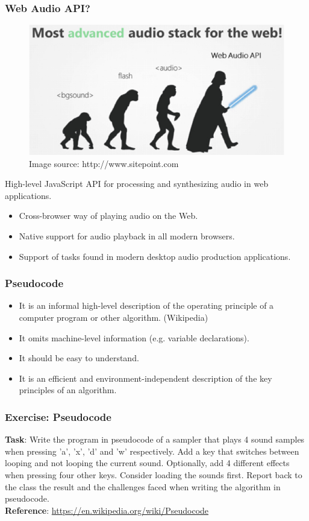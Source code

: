 \documentclass[screen, aspectratio=43]{beamer}
\begin{document}
\begin{frame}
\frametitle{Web Audio API?}
\begin{figure}
\includegraphics[scale=0.3]{img/advanced-web-audio.jpg}
{\\ \tiny Image source: http://www.sitepoint.com}\\
\end{figure}
High-level JavaScript API for processing and synthesizing audio in web applications.
\begin{itemize}
\item Cross-browser way of playing audio on the Web.
\item Native support for audio playback in all modern browsers.
\item Support of tasks found in modern desktop audio production applications.
\end{itemize}
\end{frame}
%
\begin{frame}
\frametitle{Pseudocode}
\begin{itemize}
\item It is an informal high-level description of the operating principle of a computer program or other algorithm. (Wikipedia)
\item It omits machine-level information (e.g. variable declarations).
\item It should be easy to understand.
\item It is an efficient and environment-independent description of the key principles of an algorithm.
\end{itemize}
\end{frame}
%
\begin{frame}
\frametitle{Exercise: Pseudocode}

\textbf{Task}: Write the program in pseudocode of a sampler that plays 4 sound samples when pressing 'a', 'x', 'd' and 'w' respectively. Add a key that switches between looping and not looping the current sound. Optionally, add 4 different effects when pressing four other keys. Consider loading the sounds first. Report back to the class the result and the challenges faced when writing the algorithm in pseudocode. \\
\hfill \break
\textbf{Reference}: \url{https://en.wikipedia.org/wiki/Pseudocode}\\
\end{frame}
%
%
%
\end{document}
